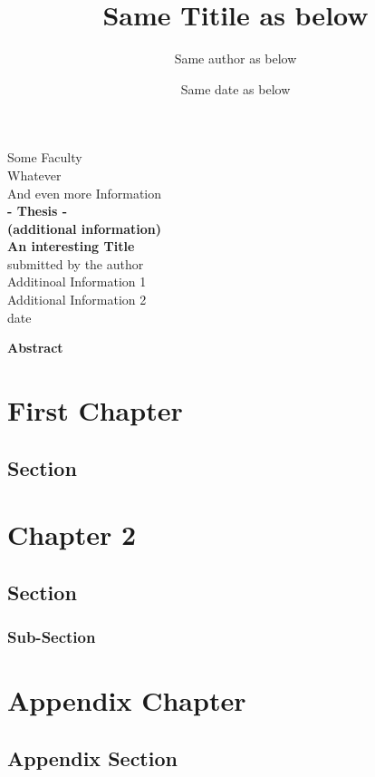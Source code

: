 \documentclass[12pt]{book}
\title{Same Titile as below}
\author{Same author as below}
\date{Same date as below}
\begin{document}
\frontmatter
\begin{titlepage}
    \thispagestyle{empty}
    \begin{center}
      \large
      Some Faculty \\
      Whatever \\
      And even more Information \\
      \vspace{4cm}
      {\bfseries - Thesis -} \\
      {\bfseries (additional information)} \\
      \vspace{1cm}
      {\LARGE \bfseries An interesting Title} \\
      \vspace{0.5cm}
      submitted by the author \\
      \vspace{6cm}
      Additinoal Information 1 \\
      Additional Information 2 \\
      date \\
    \end{center}
\end{titlepage} 

\cleardoublepage
\vfill
{\hfill\Huge\textbf{Abstract}\hfill}

\noindent
\lipsum[2-4]
\cite{customlabel}

\newpage
\tableofcontents

\listoffigures
\begingroup
\let\clearpage\relax
\listoftables
\endgroup

\cleardoublepage
\mainmatter
\setcounter{page}{1}



\chapter{First Chapter}
\lipsum[2-4]
 
\section{Section}
\lipsum[2-4]

\chapter{Chapter 2}
\lipsum[2-4]

\section{Section}
\lipsum[2-4]
\subsection{Sub-Section}
\lipsum[2-4]


\begingroup
\setlength{\emergencystretch}{.5em}
\printbibliography
\endgroup


\appendix


\chapter{Appendix Chapter}
\lipsum[2-4]
\section{Appendix Section}
\lipsum[2-4]
\end{document}
